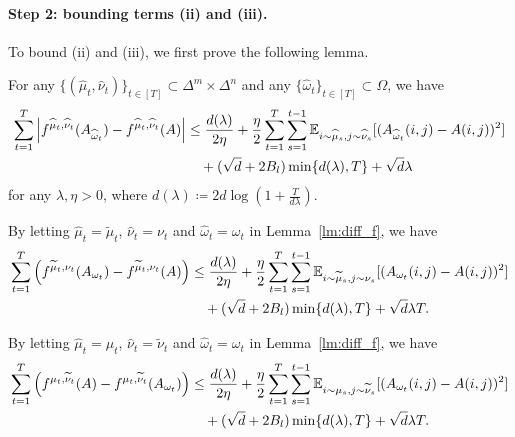 \paragraph{Step 2: bounding terms (ii) and (iii).} To bound (ii) and (iii), we first prove the following lemma.
\begin{lm}\label{lm:diff_f}
    For any $\{(\widehat{\mu}_t,\widehat{\nu}_t)\}_{t\in[T]}\subset \Delta^m\times\Delta^n$ and any $\{\widehat{\omega}_t\}_{t\in[T]}\subset\Omega$, we have
    \begin{align}\label{eq:diff_f}
        \sum_{t=1}^T \left| f^{\widehat{\mu}_t,\widehat{\nu}_t}(A_{\widehat{\omega}_t}) - f^{\widehat{\mu}_t,\widehat{\nu}_t}(A)\right| 
    &\leq \frac{d(\lambda)}{2\eta} +\frac{\eta}{2}\sum_{t=1}^T \sum_{s=1}^{t-1} \mathbb{E}_{i\sim\widehat{\mu}_s,j\sim\widehat{\nu}_s} [(A_{\widehat{\omega}_t}(i,j)-A(i,j))^2]  \nonumber\\ 
    & \quad + (\sqrt{d}+2B_l) \min\{d(\lambda),T\} +\sqrt{d} \lambda
    \end{align}
    for any $\lambda,\eta>0$, where $d(\lambda)\coloneqq 2d\log\left(1+\frac{T}{d\lambda}\right)$.
\end{lm}

By letting $\widehat{\mu}_t=\widetilde{\mu}_t$, $\widehat{\nu}_t=\nu_t$ and $\widehat{\omega}_t=\omega_t$ in Lemma~\ref{lm:diff_f}, we have
\begin{align}\label{eq:bound_ii_1}
    \sum_{t=1}^T \left(f^{\widetilde{\mu}_t,\nu_t}(A_{\omega_t})-f^{\widetilde{\mu}_t,\nu_t}(A)\right)
    &\leq \frac{d(\lambda)}{2\eta} +\frac{\eta}{2}\sum_{t=1}^T \sum_{s=1}^{t-1} \mathbb{E}_{i\sim\widetilde{\mu}_s,j\sim\nu_s} [(A_{\omega_t}(i,j)-A(i,j))^2] \notag\\
    & \quad+ (\sqrt{d}+2B_l) \min\{d(\lambda),T\} +\sqrt{d} \lambda T. 
\end{align} 


By letting $\widehat{\mu}_t=\mu_t$, $\widehat{\nu}_t=\widetilde{\nu}_t$ and $\widehat{\omega}_t=\omega_t$ in Lemma~\ref{lm:diff_f}, we have 
\begin{align}\label{eq:bound_ii_2}
    \sum_{t=1}^T \left(f^{\mu_t,\widetilde{\nu}_t}(A)-f^{\mu_t,\widetilde{\nu}_t}(A_{\omega_t})\right)     &\leq \frac{d(\lambda)}{2\eta} +\frac{\eta}{2}\sum_{t=1}^T \sum_{s=1}^{t-1} \mathbb{E}_{i\sim\mu_s,j\sim\widetilde{\nu}_s} [(A_{\omega_t}(i,j)-A(i,j))^2] \nonumber \\
    & \quad + (\sqrt{d}+2B_l) \min\{d(\lambda),T\} +\sqrt{d} \lambda T. 
\end{align}

